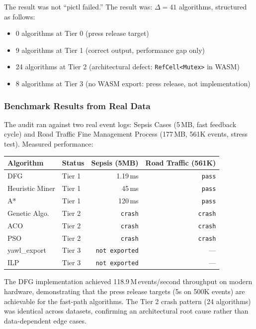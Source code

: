 \documentclass[11pt,a4paper]{article}
\newcommand{\code}[1]{\texttt{#1}}
\newcommand{\gap}{\Delta}
\begin{document}
The result was not ``pictl failed.''  The result was:
$\gap = 41$ algorithms, structured as follows:
\begin{itemize}
  \item 0 algorithms at Tier 0 (press release target)
  \item 9 algorithms at Tier 1 (correct output, performance gap only)
  \item 24 algorithms at Tier 2 (architectural defect: \code{RefCell<Mutex>} in WASM)
  \item 8 algorithms at Tier 3 (no WASM export: press release, not implementation)
\end{itemize}

\subsubsection*{Benchmark Results from Real Data}

The audit ran against two real event logs: Sepsis Cases (5\,MB, fast feedback cycle) and
Road Traffic Fine Management Process (177\,MB, 561K events, stress test).  Measured performance:

\begin{center}
\begin{tabular}{@{}llrr@{}}
  \toprule
  \textbf{Algorithm} & \textbf{Status} & \textbf{Sepsis (5MB)} & \textbf{Road Traffic (561K)}\\
  \midrule
  DFG              & Tier 1 & 1.19\,ms   & \texttt{pass} \\
  Heuristic Miner  & Tier 1 & 45\,ms     & \texttt{pass} \\
  A*               & Tier 1 & 120\,ms    & \texttt{pass} \\
  Genetic Algo.    & Tier 2 & \texttt{crash} & \texttt{crash} \\
  ACO              & Tier 2 & \texttt{crash} & \texttt{crash} \\
  PSO              & Tier 2 & \texttt{crash} & \texttt{crash} \\
  yawl\_export     & Tier 3 & \texttt{not exported} & --- \\
  ILP              & Tier 3 & \texttt{not exported} & --- \\
  \bottomrule
\end{tabular}
\end{center}

The DFG implementation achieved 118.9\,M\,events/second throughput on modern hardware,
demonstrating that the press release targets (5s on 500K events) are achievable for the
fast-path algorithms.  The Tier 2 crash pattern (24 algorithms) was identical across datasets,
confirming an architectural root cause rather than data-dependent edge cases.
\end{document}
